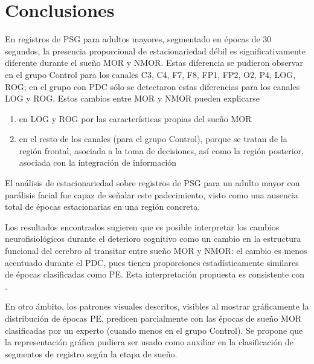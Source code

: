 
\section{Conclusiones}

En registros de PSG para adultos mayores, segmentado en \'epocas de 30 segundos, la presencia 
proporcional de estacionariedad d\'ebil es significativamente diferente durante el sue\~no MOR y 
NMOR.
Estas diferencia se pudieron observar en el grupo Control para los canales C3, C4, F7, F8, FP1, 
FP2, O2, P4, LOG, ROG; en el grupo con PDC s\'olo se detectaron estas diferencias para los canales 
LOG y ROG.
Estos cambios entre MOR y NMOR pueden explicarse 
\begin{enumerate}
\item en LOG y ROG por las caracter\'isticas propias  del sue\~no MOR
\item en el resto de los canales (para el grupo Control), porque se tratan de la 
regi\'on frontal, asociada a la toma de decisiones, as\'i como la regi\'on posterior, 
asociada con la integraci\'on
de informaci\'on
\end{enumerate}

El an\'alisis de estacionariedad sobre registros de PSG para un adulto mayor con par\'alisis facial 
fue capaz de se\~nalar este padecimiento, visto como una ausencia total de \'epocas estacionarias
en una regi\'on concreta.

Los resultados encontrados sugieren que es posible interpretar los cambios neurofisiol\'ogicos 
durante el deterioro cognitivo como un cambio en la estructura funcional del cerebro al transitar 
entre sue\~no MOR y NMOR: el cambio es menos acentuado durante el PDC, pues tienen proporciones 
estad\'isticamente similares de \'epocas clasificadas como PE.
Esta interpretaci\'on propuesta es consistente con \cite{Valeria}.

En otro \'ambito, los patrones visuales descritos, visibles al mostrar gr\'aficamente la 
distribuci\'on de \'epocas PE, predicen parcialmente con las \'epocas de sue\~no MOR clasificadas 
por un experto (cuando menos en el grupo Control).
Se propone que la representaci\'on gr\'afica pudiera ser usado como auxiliar en la clasificaci\'on 
de segmentos de registro seg\'un la etapa de sue\~no.

